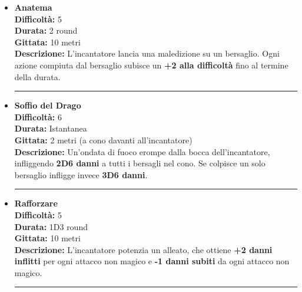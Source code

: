 \documentclass[./magie.tex]{subfiles}
\begin{document}
\begin{itemize}

\item \textbf{Anatema} \\
\textbf{Difficoltà:} 5 \\
\textbf{Durata:} 2 round \\
\textbf{Gittata:} 10 metri \\
\textbf{Descrizione:} L'incantatore lancia una maledizione su un bersaglio. Ogni azione compiuta dal bersaglio subisce un \textbf{+2 alla difficoltà} fino al termine della durata.

\vspace{0.2cm}
\noindent
\begin{center}
\rule{\textwidth}{0.4pt} 
\end{center}
\vspace{0.2cm}

\item \textbf{Soffio del Drago} \\
\textbf{Difficoltà:} 6 \\
\textbf{Durata:} Istantanea \\
\textbf{Gittata:} 2 metri (a cono davanti all'incantatore) \\
\textbf{Descrizione:} Un'ondata di fuoco erompe dalla bocca dell'incantatore, infliggendo \textbf{2D6 danni} a tutti i bersagli nel cono. Se colpisce un solo bersaglio infligge invece \textbf{3D6 danni}.

\vspace{0.2cm}
\noindent
\begin{center}
\rule{\textwidth}{0.4pt} 
\end{center}
\vspace{0.2cm}

\item \textbf{Rafforzare} \\
\textbf{Difficoltà:} 5 \\
\textbf{Durata:} 1D3 round \\
\textbf{Gittata:} 10 metri \\
\textbf{Descrizione:} L'incantatore potenzia un alleato, che ottiene \textbf{+2 danni inflitti} per ogni attacco non magico e \textbf{-1 danni subiti} da ogni attacco non magico.

\vspace{0.2cm}
\noindent
\begin{center}
\rule{\textwidth}{0.4pt} 
\end{center}
\vspace{0.2cm}


\end{itemize}
\end{document}
